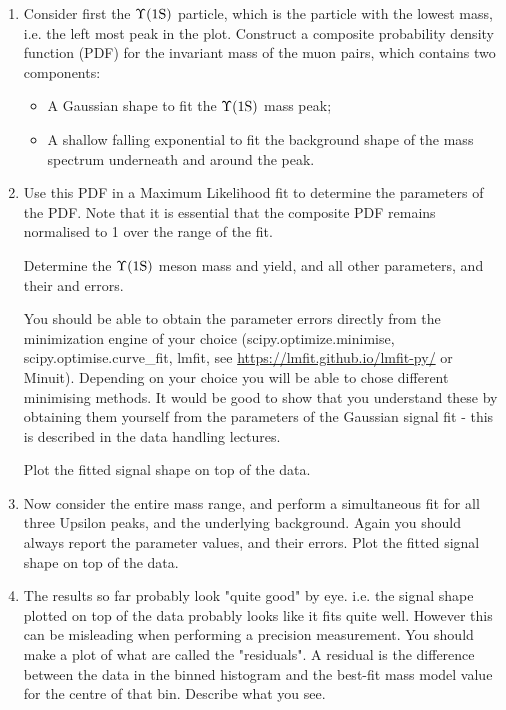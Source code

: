 \begin{enumerate}
\item Consider first the $\Upsilon \rm (1S)$ particle, which is the particle with the lowest mass, i.e. the left most  peak in the plot. Construct a composite probability density function (PDF) for the invariant mass of the muon pairs, which contains two components:
\begin{itemize}
\item A Gaussian shape to fit the  $\Upsilon \rm (1S)$ mass peak;
\item A shallow falling exponential to fit the background shape of the mass spectrum underneath and around the peak.
\end{itemize}

\item Use this PDF in a Maximum Likelihood fit to determine the parameters of the PDF. Note that it is essential that the composite PDF remains normalised to 1 over the range of the fit.

Determine the $\Upsilon \rm (1S)$  meson mass and yield, and all other parameters, and their and errors.

You should be able to obtain the parameter errors directly from the minimization engine of your choice (scipy.optimize.minimise, scipy.optimise.curve\_fit, lmfit, see \url{https://lmfit.github.io/lmfit-py/} or Minuit). Depending on your choice you will be able to chose different minimising methods.
It would be good to show that you understand these by obtaining them yourself from the parameters of the Gaussian signal fit - this is described in the data handling lectures.

Plot the fitted signal shape on top of the data.

\item Now consider the entire mass range, and perform a simultaneous fit for all three Upsilon peaks, and the underlying background. Again you should always report the parameter values, and their errors. Plot the fitted signal shape on top of the data.

\item The results so far probably look "quite good" by eye.  i.e. the signal shape plotted on top of the data probably looks like it fits quite well.  However this can be misleading when performing a precision measurement.  You should make a plot of what are called the "residuals". A residual is the difference between the data in the binned histogram and the best-fit mass model value for the centre of that bin. Describe what you see.


\end{enumerate}
